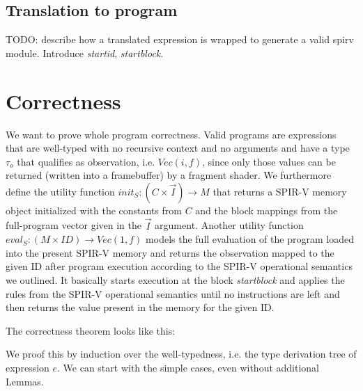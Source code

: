 \documentclass[letterpaper,12pt]{article}
\newcommand{\vi}{\vec{I}}
\begin{document}
\subsection{Translation to program}

TODO: describe how a translated expression is wrapped to generate a valid
spirv module. Introduce \textit{startid}, \textit{startblock}.

\section{Correctness}

We want to prove whole program correctness. Valid programs are expressions
that are well-typed with no recursive context and no arguments and
have a type $\tau_o$ that qualifies as observation, i.e. $Vec(i, f)$, since only
those values can be returned (written into a framebuffer) by a fragment shader.
We furthermore define the utility function
$init_S: (C \times \vi) \rightarrow M $ that returns
a SPIR-V memory object initialized with the constants from $C$ and the 
block mappings from the full-program vector given in the $\vi$ argument.
Another utility function $eval_S: (M \times ID) \rightarrow Vec(1, f)$
models the full evaluation of the program loaded into the present SPIR-V
memory and returns the observation mapped to the given ID after
program execution according to the SPIR-V operational semantics we
outlined. It basically starts execution at the block \textit{startblock}
and applies the rules from the SPIR-V operational semantics until
no instructions are left and then returns the value present in the
memory for the given ID.

The correctness theorem looks like this:

\begin{center}
\end{center}

We proof this by induction over the well-typedness, i.e. the type
derivation tree of expression $e$. We can start with the simple
cases, even without additional Lemmas.
\end{document}
